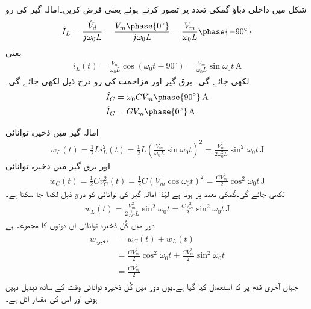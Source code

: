 شکل  میں داخلی دباؤ گمکی تعدد پر تصور کرتے ہوئے  یعنی  فرض کریں۔امالہ گیر کی رو
\begin{align}\label{مساوات_تعددی_متوازی_رو_الف}
\hat{I}_L=\frac{\hat{V}_d}{j\omega_0 L}=\frac{V_m\phase{0^{\circ}}}{j\omega_0 L}=\frac{V_m}{\omega_0 L}\phase{-90^{\circ}}
\end{align}
یعنی
\begin{align*}
i_L(t)=\frac{V_m}{\omega_0 L} \cos (\omega_0 t -90^{\circ})=\frac{V_m}{\omega_0 L} \sin \omega_0 t \,\si{\ampere}
\end{align*}
لکھی جائے گی۔ برق گیر اور مزاحمت کی رو درج ذیل لکھی جائے گی۔
\begin{gather}
\begin{aligned}\label{مساوات_تعددی_متوازی_رو_ب}
\hat{I}_C&=\omega_0 C V_m \phase{90^{\circ}} \, \si{\ampere}\\
\hat{I}_G&=GV_m\phase{0^{\circ}}\,\si{\ampere}
\end{aligned}
\end{gather}

امالہ گیر میں ذخیرہ توانائی
\begin{align}\label{مساوات_تعددی_متوازی_امالی_ذخیرہ_توانائی}
w_L(t)=\frac{1}{2} L i_L^2(t)=\frac{1}{2} L \left(\frac{V_m}{\omega_0 L} \sin \omega_0 t\right)^2=\frac{V_m^2}{2\omega_0^2 L}\sin^2 \omega_0 t \, \si{\joule}
\end{align}
اور برق گیر میں ذخیرہ توانائی
\begin{align*}
w_C(t)=\frac{1}{2} C v_C^2(t)=\frac{1}{2} C\left(V_m \cos \omega_0 t\right)^2=\frac{CV_m^2}{2}\cos^2 \omega_0 t \, \si{\joule}
\end{align*}
لکھی جائے گی۔گمکی تعدد پر  ہوتا ہے لہٰذا امالہ گیر کی توانائی کو درج ذیل لکھا جا سکتا ہے۔
\begin{align}\label{مساوات_تعددی_متوازی_امالہ_گیر_ذخیرہ_توانائی}
w_L(t)=\frac{V_m^2}{2\frac{1}{LC} L}\sin^2 \omega_0 t=\frac{CV_m^2}{2}\sin^2 \omega_0 t \, \si{\joule}
\end{align}
دور میں کُل ذخیرہ توانائی ان دونوں کا مجموعہ ہے
\begin{gather}
\begin{aligned}\label{مساوات_تعددی_متوازی_کل_ذخیرہ_توانائی}
w_{\text{ذخیرہ}}&=w_C(t)+w_L(t)\\
&=\frac{CV_m^2}{2}\cos^2 \omega_0 t+\frac{CV_m^2}{2}\sin^2 \omega_0 t\\
&=\frac{CV_m^2}{2}
\end{aligned}
\end{gather}
جہاں آخری قدم پر  کا استعمال کیا گیا ہے۔یوں دور میں کُل ذخیرہ توانائی وقت کے ساتھ تبدیل نہیں ہوتی اور اس کی مقدار اٹل ہے۔

